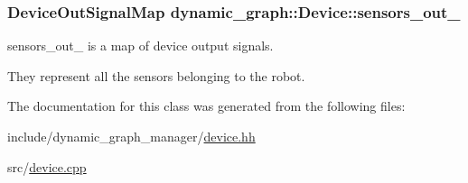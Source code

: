 \subsubsection[{\texorpdfstring{sensors\+\_\+out\+\_\+}{sensors_out_}}]{\setlength{\rightskip}{0pt plus 5cm}Device\+Out\+Signal\+Map dynamic\+\_\+graph\+::\+Device\+::sensors\+\_\+out\+\_\+}\hypertarget{classdynamic__graph_1_1Device_ab397e65116cdc32ffa767bfc92c0b7e0}{}\label{classdynamic__graph_1_1Device_ab397e65116cdc32ffa767bfc92c0b7e0}


sensors\+\_\+out\+\_\+ is a map of device output signals. 

They represent all the sensors belonging to the robot. 

The documentation for this class was generated from the following files\+:\begin{DoxyCompactItemize}
\item 
include/dynamic\+\_\+graph\+\_\+manager/\hyperlink{device_8hh}{device.\+hh}\item 
src/\hyperlink{device_8cpp}{device.\+cpp}\end{DoxyCompactItemize}
